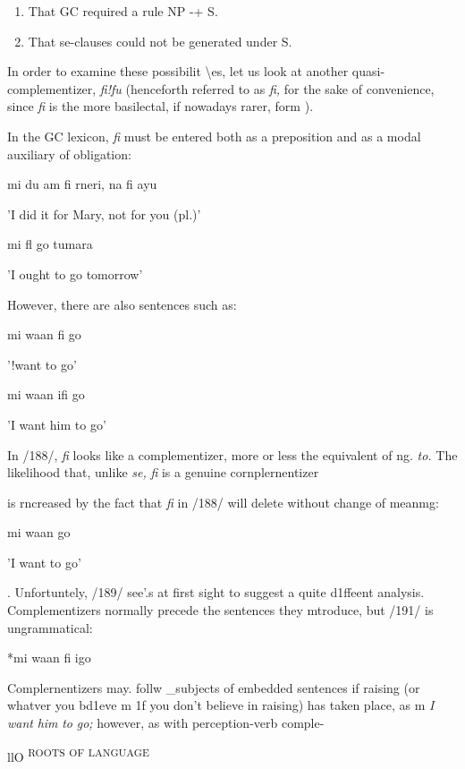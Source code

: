 \begin{enumerate}
\item That GC required a rule NP {}-+ S.
\item That se-clauses could not be generated under S.
\end{enumerate}
 

In order to examine these possibilit {\textbackslash}es, let us look at another quasi{}-
complementizer, \textit{fi!fu }(henceforth referred to as \textit{fi, }for the sake of convenience, since \textit{fi} is the more basilectal, if nowadays rarer, form ).

In the GC lexicon, \textit{fi }must be entered both as a preposition and as a modal auxiliary of obligation:

\ea\label{ex:186}
 mi du am fi rneri, na fi ayu
\glt
\z

'I did it for Mary, not for you (pl.)'

\ea\label{ex:187}
 mi fl go tumara
\glt
\z

'I ought to go tomorrow'

However, there are also sentences such as:

\ea\label{ex:188}
 mi waan fi go
\glt
\z

'!want to go'

\ea\label{ex:189}
 mi waan ifi go
\glt
\z

'I want him to go'

In /188/, \textit{fi} looks like a complementizer, more or less the equivalent of ng. \textit{to.} The likelihood that, unlike \textit{se,} \textit{fi} is a genuine cornplernentizer

is rncreased by the fact that \textit{fi }in /188/ will delete without change of meanmg:

\ea\label{ex:190}
 mi waan go
\glt
\z

'I want to go'

. Unfortuntely, /189/ see'.{\textquotedbl}s at first sight to suggest a quite d1ffeent analysis. Complementizers normally precede the sentences they mtroduce, but /191/ is ungrammatical:

\ea\label{ex:191}
 *mi waan fi igo
\glt
\z

Complernentizers may. follw \_subjects of embedded sentences if raising (or whatver you bd1eve m 1f you don't believe in raising) has taken place, as m \textit{I} \textit{want} \textit{him} \textit{to} \textit{go;} however, as with perception-verb comple-

llO \textsuperscript{ROOTS} \textsuperscript{OF} \textsuperscript{LANGUAGE}

